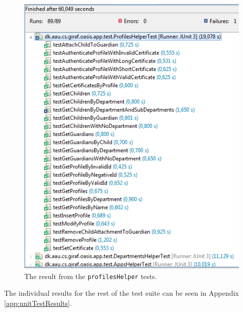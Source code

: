 \begin{figure}[H]
	\centering
		\includegraphics[width=\textwidth]{Images/unit_testing/profile_helper_tests.PNG}
	\caption{The result from the \texttt{profilesHelper} tests.}
	\label{fig:profile_helper_tests}
\end{figure}

The individual results for the rest of the test suite can be seen in Appendix \vref{app:unitTestResults}.